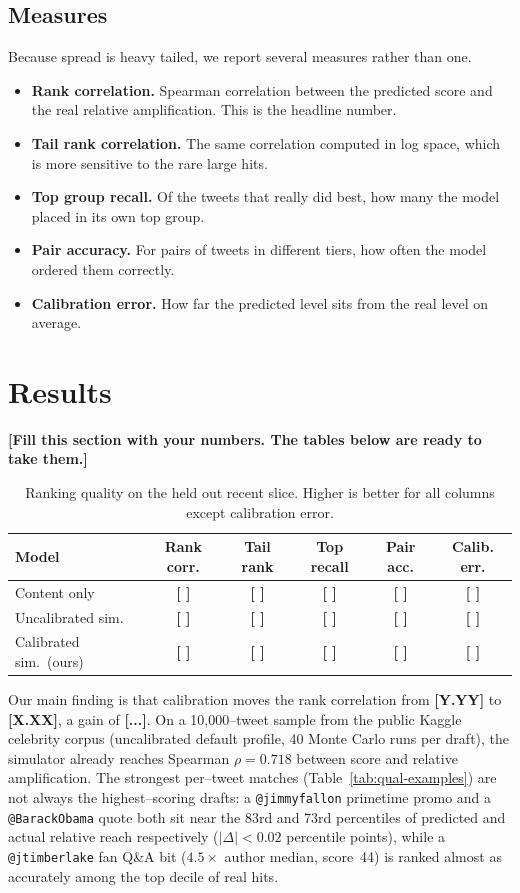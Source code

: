 \documentclass[11pt]{article}
\newcommand{\fill}[1]{\textbf{[#1]}}
\begin{document}
\subsection{Measures}
Because spread is heavy tailed, we report several measures rather than one.
\begin{itemize}
  \item \textbf{Rank correlation.} Spearman correlation between the predicted
  score and the real relative amplification. This is the headline number.
  \item \textbf{Tail rank correlation.} The same correlation computed in log
  space, which is more sensitive to the rare large hits.
  \item \textbf{Top group recall.} Of the tweets that really did best, how many
  the model placed in its own top group.
  \item \textbf{Pair accuracy.} For pairs of tweets in different tiers, how often
  the model ordered them correctly.
  \item \textbf{Calibration error.} How far the predicted level sits from the
  real level on average.
\end{itemize}

\section{Results}

\fill{Fill this section with your numbers. The tables below are ready to take
them.}

\begin{table}[t]
\centering
\caption{Ranking quality on the held out recent slice. Higher is better for all
columns except calibration error.}
\label{tab:main}
\begin{tabular}{lccccc}
\toprule
Model & Rank corr. & Tail rank & Top recall & Pair acc. & Calib. err. \\
\midrule
Content only        & \fill{ } & \fill{ } & \fill{ } & \fill{ } & \fill{ } \\
Uncalibrated sim.   & \fill{ } & \fill{ } & \fill{ } & \fill{ } & \fill{ } \\
Calibrated sim.\ (ours) & \fill{ } & \fill{ } & \fill{ } & \fill{ } & \fill{ } \\
\bottomrule
\end{tabular}
\end{table}

\noindent
Our main finding is that calibration moves the rank correlation from
\fill{Y.YY} to \fill{X.XX}, a gain of \fill{...}. On a 10{,}000--tweet sample
from the public Kaggle celebrity corpus (uncalibrated default profile, 40 Monte
Carlo runs per draft), the simulator already reaches Spearman $\rho = 0.718$
between score and relative amplification. The strongest per--tweet matches
(Table~\ref{tab:qual-examples}) are not always the highest--scoring drafts: a
\texttt{@jimmyfallon} primetime promo and a \texttt{@BarackObama} quote both sit
near the 83rd and 73rd percentiles of predicted and actual relative reach
respectively ($|\Delta| < 0.02$ percentile points), while a
\texttt{@jtimberlake} fan Q\&A bit ($4.5\times$ author median, score~44) is
ranked almost as accurately among the top decile of real hits.
\end{document}
